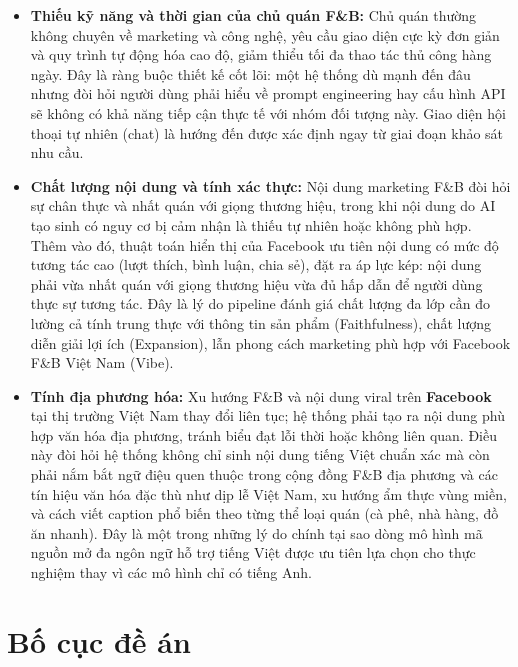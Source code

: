 \begin{itemize}
\item
  \textbf{Thiếu kỹ năng và thời gian của chủ quán F\&B:}
  Chủ quán thường không chuyên về marketing và công nghệ, yêu cầu giao
  diện cực kỳ đơn giản và quy trình tự động hóa cao độ, giảm thiểu tối
  đa thao tác thủ công hàng ngày. Đây là ràng buộc thiết kế cốt lõi:
  một hệ thống dù mạnh đến đâu nhưng đòi hỏi người dùng phải hiểu về
  prompt engineering hay cấu hình API sẽ không có khả năng tiếp cận
  thực tế với nhóm đối tượng này. Giao diện hội thoại tự nhiên (chat)
  là hướng đến được xác định ngay từ giai đoạn khảo sát nhu cầu.

\item
  \textbf{Chất lượng nội dung và tính xác thực:}
  Nội dung marketing F\&B đòi hỏi sự chân thực và nhất quán với giọng
  thương hiệu, trong khi nội dung do AI tạo sinh có nguy cơ bị cảm nhận
  là thiếu tự nhiên hoặc không phù hợp. Thêm vào đó, thuật toán hiển
  thị của Facebook ưu tiên nội dung có mức độ tương tác cao (lượt thích,
  bình luận, chia sẻ), đặt ra áp lực kép: nội dung phải vừa nhất quán
  với giọng thương hiệu vừa đủ hấp dẫn để người dùng thực sự tương tác.
  Đây là lý do pipeline đánh giá chất lượng đa lớp cần đo lường cả tính
  trung thực với thông tin sản phẩm (Faithfulness), chất lượng diễn giải
  lợi ích (Expansion), lẫn phong cách marketing phù hợp với Facebook
  F\&B Việt Nam (Vibe).

\item
  \textbf{Tính địa phương hóa:}
  Xu hướng F\&B và nội dung viral trên \textbf{Facebook} tại thị trường
  Việt Nam thay đổi liên tục; hệ thống phải tạo ra nội dung phù hợp văn
  hóa địa phương, tránh biểu đạt lỗi thời hoặc không liên quan. Điều
  này đòi hỏi hệ thống không chỉ sinh nội dung tiếng Việt chuẩn xác mà
  còn phải nắm bắt ngữ điệu quen thuộc trong cộng đồng F\&B địa phương
  và các tín hiệu văn hóa đặc thù như dịp lễ Việt Nam, xu hướng ẩm
  thực vùng miền, và cách viết caption phổ biến theo từng thể loại quán
  (cà phê, nhà hàng, đồ ăn nhanh). Đây là một trong những lý do chính
  tại sao dòng mô hình mã nguồn mở đa ngôn ngữ hỗ trợ tiếng Việt được
  ưu tiên lựa chọn cho thực nghiệm thay vì các mô hình chỉ có tiếng Anh.
\end{itemize}

\section{Bố cục đề án}\label{sec:bo-cuc}

